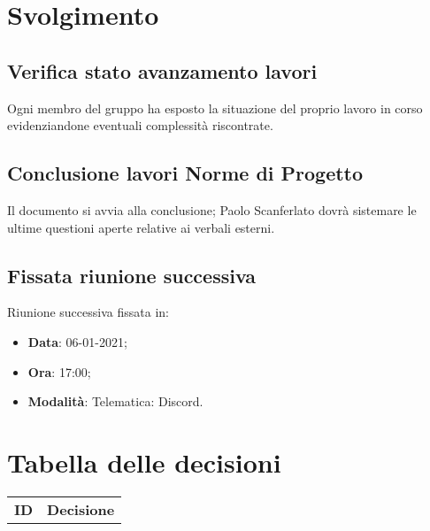 \documentclass[]{article}
\begin{document}
	\newpage

	\section{Svolgimento}
		\subsection{Verifica stato avanzamento lavori}
		Ogni membro del gruppo ha esposto la situazione del proprio lavoro in corso evidenziandone eventuali complessità riscontrate.

		\subsection{Conclusione lavori Norme di Progetto}
		Il documento  si avvia alla conclusione; Paolo Scanferlato dovrà sistemare le ultime questioni aperte relative ai verbali esterni.

		\subsection{Fissata riunione successiva}
		Riunione successiva fissata in:
		\begin{itemize}
			\item \textbf{Data}: 06-01-2021;
			\item \textbf{Ora}: 17:00;
			\item \textbf{Modalità}: Telematica: Discord.
		\end{itemize}
	
	\newpage
	
	\section{Tabella delle decisioni}
	
	\begin{table} [h!]
		\begin{center}
			\begin{tabular} { m{2cm} m{14cm} }
				\rowcolor{lightgray}
				\textbf{ID} & \textbf{Decisione} \\
				
			\end{tabular}

		\end{center}
	\end{table}
	
\end{document}
